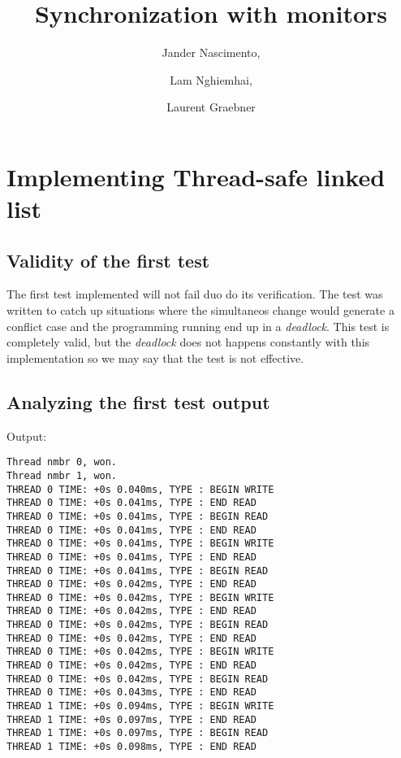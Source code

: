 \documentclass{article}
\begin{document}
\title{Synchronization with monitors}

\author{Jander Nascimento,
\and Lam Nghiemhai, 
\and Laurent Graebner}

\maketitle

\tableofcontents

\section{Implementing Thread-safe linked list}          

	\subsection{Validity of the first test}
		
		The first test implemented will not fail duo do its verification. The test was written
		to catch up situations where the simultaneos change would generate a conflict case and
		the programming running end up in a \textit{deadlock}.
		This test is completely valid, but the \textit{deadlock} does not happens constantly with 
		this implementation so we may say that the test is not effective.

	\subsection{Analyzing the first test output}

		Output:

		\begin{lstlisting}
Thread nmbr 0, won.
Thread nmbr 1, won.
THREAD 0 TIME: +0s 0.040ms, TYPE : BEGIN WRITE
THREAD 0 TIME: +0s 0.041ms, TYPE : END READ
THREAD 0 TIME: +0s 0.041ms, TYPE : BEGIN READ
THREAD 0 TIME: +0s 0.041ms, TYPE : END READ
THREAD 0 TIME: +0s 0.041ms, TYPE : BEGIN WRITE
THREAD 0 TIME: +0s 0.041ms, TYPE : END READ
THREAD 0 TIME: +0s 0.041ms, TYPE : BEGIN READ
THREAD 0 TIME: +0s 0.042ms, TYPE : END READ
THREAD 0 TIME: +0s 0.042ms, TYPE : BEGIN WRITE
THREAD 0 TIME: +0s 0.042ms, TYPE : END READ
THREAD 0 TIME: +0s 0.042ms, TYPE : BEGIN READ
THREAD 0 TIME: +0s 0.042ms, TYPE : END READ
THREAD 0 TIME: +0s 0.042ms, TYPE : BEGIN WRITE
THREAD 0 TIME: +0s 0.042ms, TYPE : END READ
THREAD 0 TIME: +0s 0.042ms, TYPE : BEGIN READ
THREAD 0 TIME: +0s 0.043ms, TYPE : END READ
THREAD 1 TIME: +0s 0.094ms, TYPE : BEGIN WRITE
THREAD 1 TIME: +0s 0.097ms, TYPE : END READ
THREAD 1 TIME: +0s 0.097ms, TYPE : BEGIN READ
THREAD 1 TIME: +0s 0.098ms, TYPE : END READ   
		\end{lstlisting}
\end{document}
